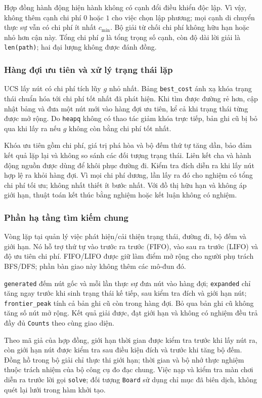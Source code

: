Hợp đồng hành động hiện hành không có cạnh đổi điều khiển độc lập. Vì vậy,
không thêm cạnh chi phí $0$ hoặc $1$ cho việc chọn lập phương; mọi cạnh di
chuyển thực sự vẫn có chi phí ít nhất $c_{\min}$. Bộ giải từ chối chi phí không
hữu hạn hoặc nhỏ hơn cận này. Tổng chi phí $g$ là tổng trọng số cạnh, còn độ
dài lời giải là \texttt{len(path)}; hai đại lượng không được đánh đồng.

\subsubsection{Hàng đợi ưu tiên và xử lý trạng thái lặp}
UCS lấy nút có chi phí tích lũy $g$ nhỏ nhất. Bảng \texttt{best\_cost} ánh xạ
khóa trạng thái chuẩn hóa tới chi phí tốt nhất đã phát hiện. Khi tìm được đường
rẻ hơn, cập nhật bảng và đưa một nút mới vào hàng đợi ưu tiên, kể cả khi trạng
thái từng được mở rộng. Do \texttt{heapq} không có thao tác giảm khóa trực tiếp,
bản ghi cũ bị bỏ qua khi lấy ra nếu $g$ không còn bằng chi phí tốt nhất.

Khóa ưu tiên gồm chi phí, giá trị phá hòa và bộ đếm thứ tự tăng dần, bảo đảm
kết quả lặp lại và không so sánh các đối tượng trạng thái. Liên kết cha và hành
động nguồn được dùng để khôi phục đường đi. Kiểm tra đích diễn ra khi lấy nút
hợp lệ ra khỏi hàng đợi. Vì mọi chi phí dương, lần lấy ra đó cho nghiệm có
tổng chi phí tối ưu; không nhất thiết ít bước nhất. Với đồ thị hữu hạn và
không áp giới hạn, thuật toán kết thúc bằng nghiệm hoặc kết luận không có nghiệm.

\subsubsection{Phần hạ tầng tìm kiếm chung}
Vòng lặp tại  quản lý việc phát hiện/cải thiện trạng
thái, đường đi, bộ đếm và giới hạn. Nó hỗ trợ thứ tự vào trước ra trước (FIFO),
vào sau ra trước (LIFO) và độ ưu tiên chi phí. FIFO/LIFO được giữ làm điểm mở
rộng cho người phụ trách BFS/DFS; phần bàn giao này không thêm các mô-đun đó.

\texttt{generated} đếm nút gốc và mỗi lần thực sự đưa nút vào hàng đợi;
\texttt{expanded} chỉ tăng ngay trước khi sinh trạng thái kế tiếp, sau kiểm tra
đích và giới hạn nút; \texttt{frontier\_peak} tính cả bản ghi cũ còn trong hàng
đợi. Bỏ qua bản ghi cũ không tăng số nút mở rộng. Kết quả giải được, đạt giới
hạn và không có nghiệm đều trả đầy đủ \texttt{Counts} theo cùng giao diện.

Theo mã giả của hợp đồng, giới hạn thời gian được kiểm tra trước khi lấy nút
ra, còn giới hạn nút được kiểm tra sau điều kiện đích và trước khi tăng bộ đếm.
Đồng hồ trong bộ giải chỉ thực thi giới hạn; thời gian và bộ nhớ thực nghiệm
thuộc trách nhiệm của bộ công cụ đo đạc chung. Việc nạp và kiểm tra màn chơi
diễn ra trước lời gọi \texttt{solve}; đối tượng \texttt{Board} sử dụng chỉ mục
đã biên dịch, không quét lại lưới trong hàm khởi tạo.

